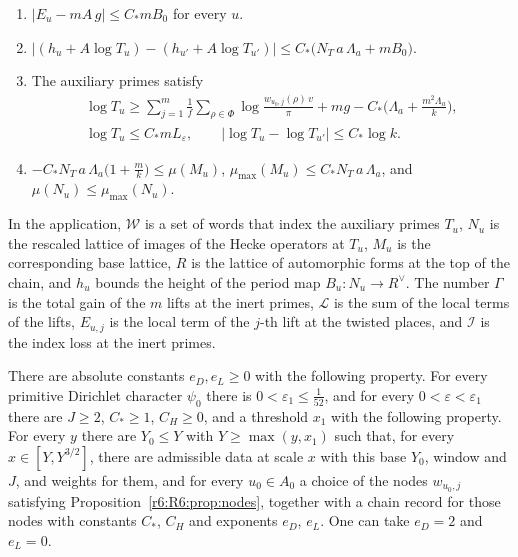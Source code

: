 \begin{definition}
\begin{enumerate}
\begin{multline*}
\end{multline*}
\item[(K5)] $\lvert E_u-mA\,g\rvert\le C_\ast m B_0$ for every $u$.
\item[(K6)] $\big\lvert(h_u+A\log T_u)-(h_{u'}+A\log T_{u'})\big\rvert\le C_\ast\big(N_T\,a\,\Lambda_a+mB_0\big)$.
\item[(K7)] The auxiliary primes satisfy
\begin{gather*}
\log T_u\ge\sum_{j=1}^m\frac1f\sum_{\rho\in\Phi}\log\frac{w_{u_0,j}(\rho)\,v}{\pi}+mg-C_\ast\Big(\Lambda_a+\frac{m^2\Lambda_a}k\Big),\\
\log T_u\le C_\ast m L_\varepsilon,\qquad\lvert\log T_u-\log T_{u'}\rvert\le C_\ast\log k .
\end{gather*}
\item[(K8)] $-C_\ast N_T\,a\,\Lambda_a\big(1+\frac mk\big)\le\mu(M_u)$, $\mu_{\max}(M_u)\le C_\ast N_T\,a\,\Lambda_a$, and $\mu(N_u)\le\mu_{\max}(N_u)$.
\end{enumerate}
\end{definition}

In the application, $\mathcal W$ is a set of words that index the auxiliary primes $T_u$, $N_u$ is the rescaled lattice of images of the Hecke operators at $T_u$, $M_u$ is the corresponding base lattice, $R$ is the lattice of automorphic forms at the top of the chain, and $h_u$ bounds the height of the period map $B_u\colon N_u\to R^\vee$. The number $\Gamma$ is the total gain of the $m$ lifts at the inert primes, $\mathcal L$ is the sum of the local terms of the lifts, $E_{u,j}$ is the local term of the $j$-th lift at the twisted places, and $\mathcal I$ is the index loss at the inert primes.

\begin{hypothesis}\label{r6:R6:thm:records}
There are absolute constants $e_D,e_L\ge0$ with the following property. For every primitive Dirichlet character $\psi_0$ there is $0<\varepsilon_1\le\frac1{52}$, and for every $0<\varepsilon<\varepsilon_1$ there are $J\ge2$, $C_\ast\ge1$, $C_H\ge0$, and a threshold $x_1$ with the following property. For every $y$ there are $Y_0\le Y$ with $Y\ge\max(y,x_1)$ such that, for every $x\in[Y,Y^{3/2}]$, there are admissible data at scale $x$ with this base $Y_0$, window and $J$, and weights for them, and for every $u_0\in A_0$ a choice of the nodes $w_{u_0,j}$ satisfying Proposition~\ref{r6:R6:prop:nodes}, together with a chain record for those nodes with constants $C_\ast$, $C_H$ and exponents $e_D$, $e_L$. One can take $e_D=2$ and $e_L=0$.
\end{hypothesis}

